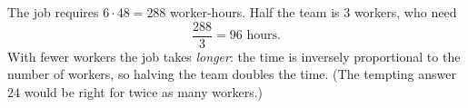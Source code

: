 The job requires $6\cdot48=288$ worker-hours. Half the team is $3$ workers, who need
\[
\dfrac{288}{3}=\boxed{96}\text{ hours}.
\]
With fewer workers the job takes \emph{longer}: the time is inversely proportional to the number of workers, so halving the team doubles the time. (The tempting answer $24$ would be right for twice as many workers.)
